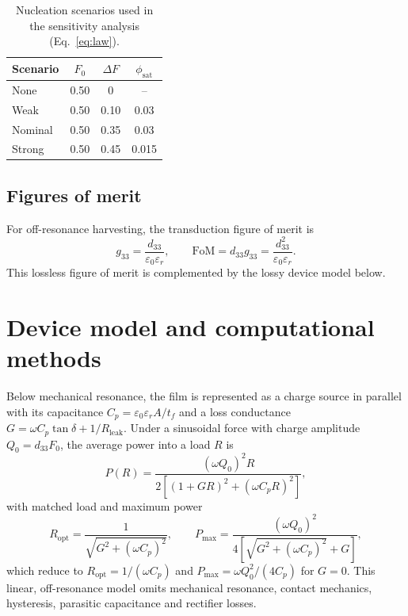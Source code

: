 \documentclass[11pt,a4paper]{article}
\newcommand{\dt}{d_{33}}
\begin{document}
\begin{table}[htbp]
\centering
\caption{Nucleation scenarios used in the sensitivity analysis (Eq.~\ref{eq:law}).}
\label{tab:scen}
\small
\begin{tabular}{lccc}
\toprule
Scenario & $F_0$ & $\Delta F$ & $\phi_{\mathrm{sat}}$ \\
\midrule
None & 0.50 & 0 & -- \\
Weak & 0.50 & 0.10 & 0.03 \\
Nominal & 0.50 & 0.35 & 0.03 \\
Strong & 0.50 & 0.45 & 0.015 \\
\bottomrule
\end{tabular}
\end{table}

\subsection{Figures of merit}
For off-resonance harvesting, the transduction figure of merit is
\begin{equation}
g_{33}=\frac{\dt}{\varepsilon_0\varepsilon_r},\qquad \mathrm{FoM}=\dt g_{33}=\frac{\dt^2}{\varepsilon_0\varepsilon_r}.
\end{equation}
This lossless figure of merit is complemented by the lossy device model below.

\section{Device model and computational methods}

Below mechanical resonance, the film is represented as a charge source in parallel with its capacitance $C_p=\varepsilon_0\varepsilon_rA/t_f$ and a loss conductance $G=\omega C_p\tan\delta+1/R_{\mathrm{leak}}$. Under a sinusoidal force with charge amplitude $Q_0=\dt F_0$, the average power into a load $R$ is
\begin{equation}
P(R)=\frac{(\omega Q_0)^2R}{2\left[(1+GR)^2+(\omega C_pR)^2\right]},
\end{equation}
with matched load and maximum power
\begin{equation}
R_{\mathrm{opt}}=\frac{1}{\sqrt{G^2+(\omega C_p)^2}},\qquad
P_{\max}=\frac{(\omega Q_0)^2}{4\left[\sqrt{G^2+(\omega C_p)^2}+G\right]},
\end{equation}
which reduce to $R_{\mathrm{opt}}=1/(\omega C_p)$ and $P_{\max}=\omega Q_0^2/(4C_p)$ for $G=0$. This linear, off-resonance model omits mechanical resonance, contact mechanics, hysteresis, parasitic capacitance and rectifier losses.
\end{document}

